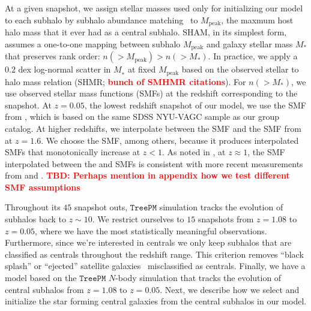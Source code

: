 \documentclass[12pt, letterpaper, preprint, tighten]{aastex}
\newcommand{\todo}[1]{{\bf \textcolor{red}{#1}}}
\begin{document}
At a given snapshot, we assign stellar masses used only for initializing
our model to each subhalo by subhalo abundance matching~\citep[SHAM;][]{conroy2006,vale2006,yang2009,wetzel2012,leja2013,wetzel2013,wetzel2014,hahn2017a}
to $M_\mathrm{peak}$, the maxmum host halo mass that it ever had as a 
central subhalo. SHAM, in its simplest form, assumes a one-to-one mapping 
between subhalo $M_\mathrm{peak}$ and galaxy stellar mass $M_*$ that 
preserves rank order: $n(> M_\mathrm{peak}) > n(> M_*)$. In practice, we 
apply a $0.2$ dex log-normal scatter in $M_∗$ at fixed $M_\mathrm{peak}$ 
based on the observed stellar to halo mass relation (SHMR; \todo{bunch of SMHMR citations}). %
For $n(> M_*)$, we use observed stellar mass functions (SMFs) at the redshift 
corresponding to the snapshot. At $z=0.05$, the lowest redshift snapshot of 
our model, we use the SMF from \cite{li2009}, which is based on the same 
SDSS NYU-VAGC sample as our group catalog. At higher redshifts, we interpolate 
between the \cite{li2009} SMF and the SMF from \cite{marchesini2009} at 
$z = 1.6$. We choose the \cite{marchesini2009} SMF, among others, because it 
produces interpolated SMFs that monotonically increase at $z < 1$. As noted 
in \cite{hahn2017a}, at $z \approx 1$, the SMF interpolated between the 
\cite{li2009} and \cite{marchesini2009} SMFs is consistent with more recent 
measurements from \cite{muzzin2013} and \cite{ilbert2013}. 
\todo{TBD: Perhaps mention in appendix how we test different SMF assumptions}%

Throughout its $45$ snapshot outs, $\mathtt{TreePM}$ simulation tracks 
the evolution of subhalos back to $z \sim 10$. We restrict ourselves to $15$ 
snapshots from $z = 1.08$ to $z=0.05$, where we have the most statistically 
meaningful observations. Furthermore, since we're interested in centrals we only 
keep subhalos that are classified as centrals throughout the redshift 
range. This criterion removes ``black splash'' or ``ejected'' satellite 
galaxies~\citep[\emph{e.g.}][]{mamon2004,wetzel2014} misclassified as 
centrals. Finally, we have a model based on the $\mathtt{TreePM}$ $N$-body 
simulation that tracks the evolution of central subhalos from $z = 1.08$ to 
$z=0.05$. Next, we describe how we select and initialize the star forming 
central galaxies from the central subhalos in our model. 

\end{document}
